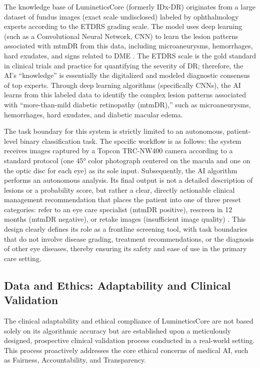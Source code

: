 \documentclass[sigplan,screen]{acmart}
\begin{document}
The knowledge base of LumineticsCore (formerly IDx-DR) originates from a large dataset of fundus images (exact scale undisclosed) labeled by ophthalmology experts according to the ETDRS grading scale. The model uses deep learning (such as a Convolutional Neural Network, CNN) to learn the lesion patterns associated with mtmDR from this data, including microaneurysms, hemorrhages, hard exudates, and signs related to DME \cite{abramoff2018pivotal}. The ETDRS scale is the gold standard in clinical trials and practice for quantifying the severity of DR; therefore, the AI's ``knowledge'' is essentially the digitalized and modeled diagnostic consensus of top experts. Through deep learning algorithms (specifically CNNs), the AI learns from this labeled data to identify the complex lesion patterns associated with ``more-than-mild diabetic retinopathy (mtmDR),'' such as microaneurysms, hemorrhages, hard exudates, and diabetic macular edema.

The task boundary for this system is strictly limited to an autonomous, patient-level binary classification task. The specific workflow is as follows: the system receives images captured by a Topcon TRC-NW400 camera according to a standard protocol (one 45° color photograph centered on the macula and one on the optic disc for each eye) as its sole input. Subsequently, the AI algorithm performs an autonomous analysis. Its final output is not a detailed description of lesions or a probability score, but rather a clear, directly actionable clinical management recommendation that places the patient into one of three preset categories: refer to an eye care specialist (mtmDR positive), rescreen in 12 months (mtmDR negative), or retake images (insufficient image quality) \cite{fda2018denovo_summary}. This design clearly defines its role as a frontline screening tool, with task boundaries that do not involve disease grading, treatment recommendations, or the diagnosis of other eye diseases, thereby ensuring its safety and ease of use in the primary care setting.

\subsection{Data and Ethics: Adaptability and Clinical Validation}

The clinical adaptability and ethical compliance of LumineticsCore are not based solely on its algorithmic accuracy but are established upon a meticulously designed, prospective clinical validation process conducted in a real-world setting. This process proactively addresses the core ethical concerns of medical AI, such as Fairness, Accountability, and Transparency.
\end{document}
